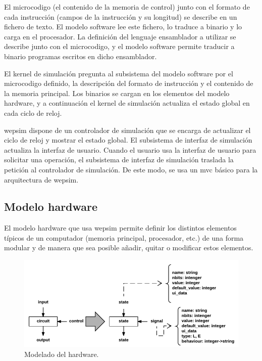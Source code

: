 El \gls{microcodigo} (el contenido de la memoria de control) junto con el formato de cada instrucción (campos de la instrucción y su longitud) se describe en un fichero de texto. El modelo \gls{software} lee este fichero, lo traduce a binario y lo carga en el procesador. La definición del lenguaje \gls{ensamblador} a utilizar se describe junto con el \gls{microcodigo}, y el modelo \gls{software} permite traducir a binario programas escritos en dicho \gls{ensamblador}.


El kernel de simulación pregunta al subsistema del modelo \gls{software} por el \gls{microcodigo} definido, la descripción del formato de instrucción y el contenido de la memoria principal. Los binarios se cargan en los elementos del modelo \gls{hardware}, y a continuación el kernel de simulación actualiza el estado global en cada ciclo de reloj.


\acrshort{wepsim} dispone de un controlador de simulación que se encarga de actualizar el ciclo de reloj y mostrar el estado global. El subsistema de interfaz de simulación actualiza la interfaz de usuario. Cuando el usuario usa la interfaz de usuario para solicitar una operación, el subsistema de interfaz de simulación traslada la petición al controlador de simulación. De este modo, se usa un \acrshort{mvc} básico para la arquitectura de \acrshort{wepsim}.

\subsection{Modelo \gls{hardware}}

El modelo \gls{hardware} que usa \acrshort{wepsim} permite definir los distintos elementos típicos de un computador (memoria principal, procesador, etc.) de una forma modular y de manera que sea posible añadir, quitar o modificar estos elementos.

\begin{figure}[htbp]
 	\centering
 	\includegraphics[width=14cm]{figures/hardware_model}
 	\caption{Modelado del \gls{hardware}.}
	\label{fig:hardware_model_diagram}
\end{figure}

